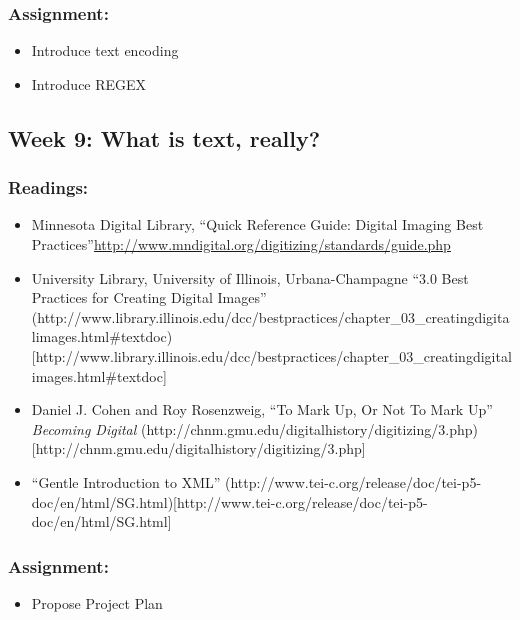 \documentclass[]{article}
\begin{document}
\subsubsection{Assignment:}\label{assignment-6}

\begin{itemize}
\itemsep1pt\parskip0pt
\item
  Introduce text encoding
\item
  Introduce REGEX
\end{itemize}

\subsection{Week 9: What is text,
really?}\label{week-9-what-is-text-really}

\subsubsection{Readings:}\label{readings-7}

\begin{itemize}
\itemsep1pt\parskip0pt
\item
  Minnesota Digital Library, ``Quick Reference Guide: Digital Imaging
  Best
  Practices''\url{http://www.mndigital.org/digitizing/standards/guide.php}
\item
  University Library, University of Illinois, Urbana-Champagne ``3.0
  Best Practices for Creating Digital Images''
  (http://www.library.illinois.edu/dcc/bestpractices/chapter\_03\_creatingdigitalimages.html\#textdoc){[}http://www.library.illinois.edu/dcc/bestpractices/chapter\_03\_creatingdigitalimages.html\#textdoc{]}
\item
  Daniel J. Cohen and Roy Rosenzweig, ``To Mark Up, Or Not To Mark Up''
  \emph{Becoming Digital}
  (http://chnm.gmu.edu/digitalhistory/digitizing/3.php){[}http://chnm.gmu.edu/digitalhistory/digitizing/3.php{]}
\item
  ``Gentle Introduction to XML''
  (http://www.tei-c.org/release/doc/tei-p5-doc/en/html/SG.html){[}http://www.tei-c.org/release/doc/tei-p5-doc/en/html/SG.html{]}
\end{itemize}

\subsubsection{Assignment:}\label{assignment-7}

\begin{itemize}
\itemsep1pt\parskip0pt
\item
  Propose Project Plan
\end{itemize}
\end{document}
